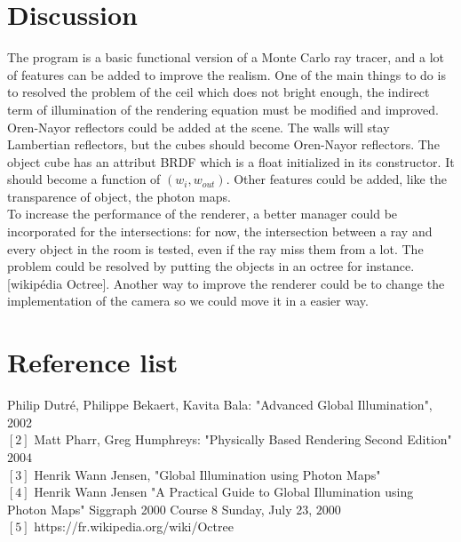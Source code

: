 \documentclass[12pt]{article}
\numberwithin{equation}{section}
\begin{document}
\section{Discussion}

The program is a basic functional version of a Monte Carlo ray tracer, and a lot of features can be added to improve the realism. One of the main things to do is to resolved the problem of the ceil which does not bright enough, the indirect term of illumination of the rendering equation must be modified and improved. Oren-Nayor reflectors could be added at the scene. The walls will stay Lambertian reflectors, but the cubes should become Oren-Nayor reflectors. The object cube has an attribut BRDF which is a float initialized in its constructor. It should become a function of $(w_i, w_{out})$. Other features could be added, like the transparence of object, the photon maps. \\	To increase the performance of the renderer, a better manager could be incorporated for the intersections: for now, the intersection between a ray and every object in the room is tested, even if the ray miss them from a lot. The problem could be resolved by putting the objects in an octree for instance.[wikipédia Octree]. Another way to improve the renderer could be to change the implementation of the camera so we could move it in a easier way.


\section{Reference list}
\noindent [1] Philip Dutr\'e, Philippe Bekaert, Kavita Bala: "Advanced Global Illumination", 2002\\
$[2]$ Matt Pharr, Greg Humphreys: "Physically Based Rendering Second Edition" $2004$\\
$[3]$ Henrik Wann Jensen, "Global Illumination using Photon Maps" \\
$[4]$ Henrik Wann Jensen "A Practical Guide to Global Illumination using Photon Maps" Siggraph 2000 Course 8 Sunday, July 23, $2000$\\
$[5]$ https://fr.wikipedia.org/wiki/Octree\\



\nocite{*}


\end{document}
